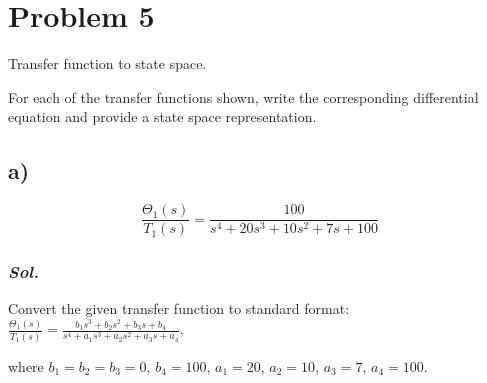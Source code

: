\section{Problem 5}
Transfer function to state space.

For each of the transfer functions shown, write the corresponding differential equation and provide a state space representation.
\subsection{a)}
\begin{equation}
    \frac{\Theta_1(s)}{T_1(s)} = \frac{100}{s^4+20s^3+10s^2+7s+100}
\end{equation}
\subsubsection{\textit{ Sol. }}
Convert the given transfer function to standard format:
$\frac{\Theta_1(s)}{T_1(s)} = \frac{b_1s^3+b_2s^2+b_3s+b_4}{s^4+a_1s^3+a_2s^2+a_3s+a_4}$, 

where $b_1 = b_2=b_3=0$, $b_4 = 100$, $a_1 = 20$, $a_2 = 10$, $a_3 = 7$, $a_4 = 100$.

